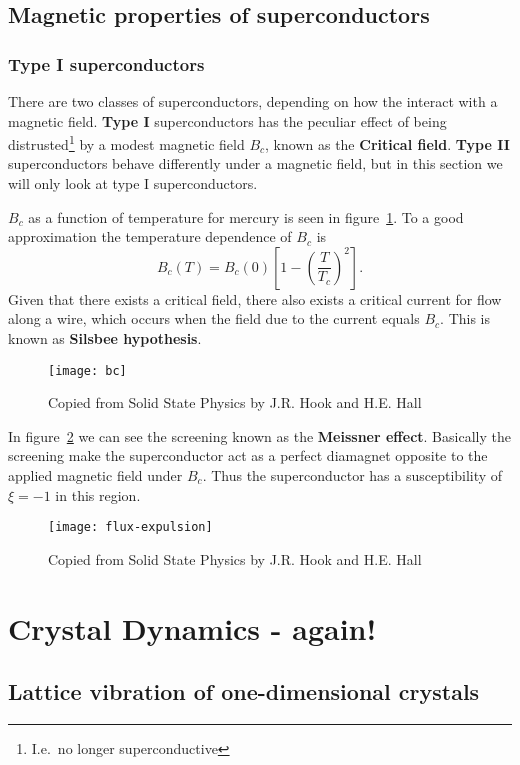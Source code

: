 \documentclass[11pt]{article}
\begin{document}
\subsection{Magnetic properties of superconductors}
\subsubsection{Type I superconductors}
There are two classes of superconductors, depending on how the interact with a magnetic field. \textbf{Type I} superconductors has the peculiar effect of being distrusted\footnote{I.e.\ no longer superconductive} by a  modest magnetic field $B_c$, known as the \textbf{Critical field}. \textbf{Type II} superconductors behave differently under a magnetic field, but in this section we will only look at type I superconductors.

$B_c$ as a function of temperature for mercury is seen in figure~\ref{fig:bc}. To a good approximation the temperature dependence of $B_c$ is
\begin{equation}
	B_c(T) = B_c(0) [1-(\frac{T}{T_c})^2].
\end{equation}
Given that there exists a critical field, there  also exists a critical current for flow along a wire, which occurs when the field due to the current equals $B_c$. This is known as \textbf{Silsbee hypothesis}. 
\begin{figure}[!ht]
	\centering
	\texttt{[image: bc]}
	\caption{Copied from Solid State Physics by J.R. Hook and H.E. Hall}
	\label{fig:bc}
\end{figure}
In figure~\ref{fig:flux-expulsion} we can see the screening known as the \textbf{Meissner effect}. Basically the screening make the superconductor act as a perfect diamagnet opposite to the applied magnetic field under $B_c$. Thus the superconductor has a susceptibility of $\xi = -1$ in this region.
\begin{figure}[!ht]
	\centering
	\texttt{[image: flux-expulsion]}
	\caption{Copied from Solid State Physics by J.R. Hook and H.E. Hall}
	\label{fig:flux-expulsion}
\end{figure}


\section{Crystal Dynamics - again!}
\subsection{Lattice vibration of one-dimensional crystals}
\end{document}
